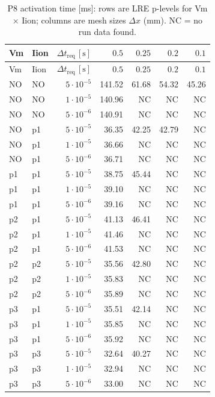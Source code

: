\documentclass[11pt,a4paper]{article}
\begin{document}
\begin{center}\footnotesize
\begin{longtable}{llrrrrr}
\caption{P8 activation time [ms]: rows are LRE p-levels for Vm $\times$ Iion; columns are mesh sizes $\Delta x$ (mm). \textsc{NC} = no run data found.}\\
\toprule
Vm & Iion & $\Delta t_{\text{req}}\,[\text{s}]$ & $0.5$ & $0.25$ & $0.2$ & $0.1$\\
\midrule\endfirsthead\toprule
Vm & Iion & $\Delta t_{\text{req}}\,[\text{s}]$ & $0.5$ & $0.25$ & $0.2$ & $0.1$\\
\midrule\endhead
NO & NO & $5\!\cdot\!10^{-5}$ & 141.52 & 61.68 & 54.32 & 45.26 \\
NO & NO & $1\!\cdot\!10^{-5}$ & 140.96 & NC & NC & NC \\
NO & NO & $5\!\cdot\!10^{-6}$ & 140.91 & NC & NC & NC \\\hline
NO & p1 & $5\!\cdot\!10^{-5}$ & 36.35 & 42.25 & 42.79 & NC \\
NO & p1 & $1\!\cdot\!10^{-5}$ & 36.66 & NC & NC & NC \\
NO & p1 & $5\!\cdot\!10^{-6}$ & 36.71 & NC & NC & NC \\\hline
p1 & p1 & $5\!\cdot\!10^{-5}$ & 38.75 & 45.44 & NC & NC \\
p1 & p1 & $1\!\cdot\!10^{-5}$ & 39.10 & NC & NC & NC \\
p1 & p1 & $5\!\cdot\!10^{-6}$ & 39.16 & NC & NC & NC \\\hline
p2 & p1 & $5\!\cdot\!10^{-5}$ & 41.13 & 46.41 & NC & NC \\
p2 & p1 & $1\!\cdot\!10^{-5}$ & 41.46 & NC & NC & NC \\
p2 & p1 & $5\!\cdot\!10^{-6}$ & 41.53 & NC & NC & NC \\\hline
p2 & p2 & $5\!\cdot\!10^{-5}$ & 35.56 & 42.80 & NC & NC \\
p2 & p2 & $1\!\cdot\!10^{-5}$ & 35.83 & NC & NC & NC \\
p2 & p2 & $5\!\cdot\!10^{-6}$ & 35.89 & NC & NC & NC \\\hline
p3 & p1 & $5\!\cdot\!10^{-5}$ & 35.51 & 42.14 & NC & NC \\
p3 & p1 & $1\!\cdot\!10^{-5}$ & 35.85 & NC & NC & NC \\
p3 & p1 & $5\!\cdot\!10^{-6}$ & 35.92 & NC & NC & NC \\\hline
p3 & p3 & $5\!\cdot\!10^{-5}$ & 32.64 & 40.27 & NC & NC \\
p3 & p3 & $1\!\cdot\!10^{-5}$ & 32.94 & NC & NC & NC \\
p3 & p3 & $5\!\cdot\!10^{-6}$ & 33.00 & NC & NC & NC \\
\bottomrule\end{longtable}\end{center}
	
\end{document}
